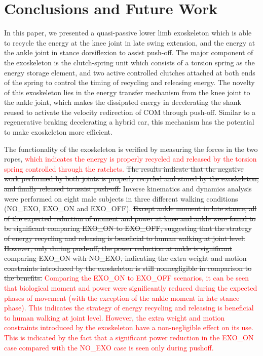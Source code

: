 \documentclass[twocolumn,cleanfoot,10pt]{asme2ej}
\begin{document}
\section{Conclusions and Future Work}
\label{sec:discussion}
In this paper, we presented a quasi-passive lower limb exoskeleton which is able to recycle the energy at the knee joint in late swing extension, and the energy at the ankle joint in stance dorsiflexion to assist push-off.
The major component of the exoskeleton is the clutch-spring unit which consists of a torsion spring as the energy storage element, and two active controlled clutches attached at both ends of the spring to control the timing of recycling and releasing energy.
The novelty of this exoskeleton lies in the energy transfer mechanism from the knee joint to the ankle joint, which makes the dissipated energy in decelerating the shank reused to activate the velocity redirection of COM through push-off.
Similar to a regenerative braking decelerating a hybrid car, this mechanism has the potential to make exoskeleton more efficient.

The functionality of the exoskeleton is verified by measuring the forces in the two ropes, \textcolor{red}{which indicates the energy is properly recycled and released by the torsion spring controlled through the ratchets.}
\sout{The results indicate that the negative work performed by both joints is properly recycled and stored by the exoskeleton, and finally released to assist push-off.}
Inverse kinematics and dynamics analysis were performed on eight male subjects in three different walking conditions (NO\_EXO, EXO\_ON and EXO\_OFF).
\sout{Except ankle moment in late stance, all of the expected reduction of moment and power at knee and ankle were found to be significant comparing EXO\_ON to EXO\_OFF, suggesting that the strategy of energy recycling and releasing is beneficial to human walking at joint level. However, only during push-off, the power reduction at ankle is significant comparing EXO\_ON with NO\_EXO, indicating the extra weight and motion constraints introduced by the exoskeleton is still nonnegligible in comparison to the benefits.}
\textcolor{red}{Comparing the EXO\_ON to EXO\_OFF scenarios, it can be seen that biological moment and power were significantly reduced during the expected phases of movement (with the exception of the ankle moment in late stance phase).
This indicates the strategy of energy recycling and releasing is beneficial to human walking at joint level.
However, the extra weight and motion constraints introduced by the exoskeleton have a non-negligible effect on its use.
This is indicated by the fact that a significant power reduction in the EXO\_ON case compared with the NO\_EXO case is seen only during pushoff.}
\end{document}
